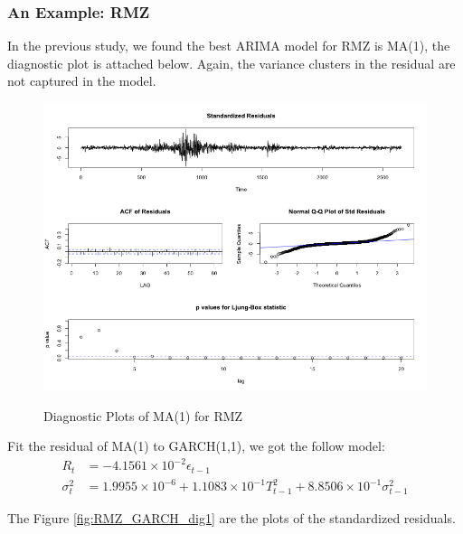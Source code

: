 \documentclass[12pt]{article}
\begin{document}
\subsubsection{An Example: RMZ}
In the previous study, we found the best ARIMA model for RMZ is MA(1), the diagnostic plot is attached below. Again, the variance clusters in the residual are not captured in the model.

\begin{figure}
  \caption{Diagnostic Plots of MA(1) for RMZ}
  \includegraphics[width = \textwidth]{../results/DiagnosticRMZ}
  \label{fig:DiagnosticRMZ}
\end{figure}

Fit the residual of MA(1) to GARCH(1,1), we got the follow model:
\begin{align*}
R_t &= -4.1561\times 10^{-2}\epsilon_{t-1} \\
\sigma_t^2 & = 1.9955 \times 10^{-6} +1.1083\times 10^{-1} T_{t-1}^2 +8.8506\times 10^{-1}  \sigma_{t-1}^2
\end{align*}

The Figure \ref{fig:RMZ_GARCH_dig1} are the plots of the standardized residuals. 
\end{document}
